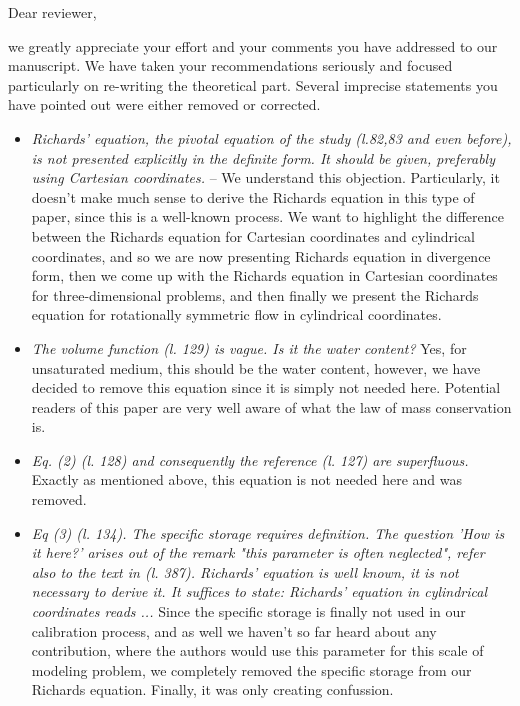 \documentclass[a4paper,12pt]{letter}
\begin{document}

Dear reviewer,

we greatly appreciate your effort and your comments you have addressed to our manuscript. We have taken your recommendations seriously and focused particularly on re-writing the theoretical part. Several imprecise statements you have pointed out were either removed or corrected.


\begin{itemize}
\item {\it Richards' equation, the pivotal equation of the study (l.82,83 and
  even before), is not presented explicitly in the definite form. It
  should be given, preferably using Cartesian coordinates.} -- We understand this objection. Particularly, it doesn't make much sense to derive the Richards equation in this type of paper, since this is a well-known process. We want to highlight the difference between the Richards equation for Cartesian coordinates and cylindrical coordinates, and so we are now presenting Richards equation in divergence form, then we come up with the Richards equation in Cartesian coordinates for three-dimensional problems, and then finally we present the Richards equation for rotationally symmetric flow in cylindrical coordinates.
  \item {\it  The volume function (l. 129) is vague. Is it the water content?} Yes, for unsaturated medium, this should be the water content, however, we have decided to remove this equation since it is simply not needed here. Potential readers of this paper are very well aware of what the law of mass conservation is.
  \item {\it Eq. (2) (l. 128) and consequently the reference (l. 127) are
  superfluous.} Exactly as mentioned above, this equation is not needed here and was removed.
  \item {\it Eq (3) (l. 134). The specific storage requires definition. The
  question 'How is it here?' arises out of the remark "this parameter
  is often neglected", refer also to the text in (l. 387). Richards'
  equation is well known, it is not necessary to derive it. It suffices
  to state: Richards' equation in cylindrical coordinates reads ...} Since the specific storage is finally not used in our calibration process, and as well we haven't so far heard about any contribution, where the authors would use this parameter for this scale of modeling problem, we completely removed the specific storage from our Richards equation. Finally, it was only creating confussion.

\end{itemize}
\end{document}
